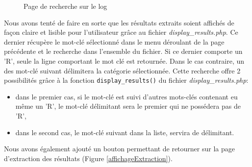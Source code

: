 \begin{figure}[!ht]
	\begin{center}
		\caption{Page de recherche sur le log}
  		\label{affichageResultats}
  	\end{center}	
\end{figure}

Nous avons tenté de faire en sorte que les résultats extraits soient affichés de façon claire et lisible pour l'utilisateur grâce au fichier \emph{display\_results.php}. Ce dernier récupère le mot-clé sélectionné dans le menu déroulant de la page précédente et le recherche dans l'ensemble du fichier. Si ce dernier comporte un 'R', seule la ligne comportant le mot clé est retournée. Dans le cas contraire, un des mot-clé suivant délimitera la catégorie sélectionnée. Cette recherche offre 2 possibilités grâce à la fonction \texttt{display\_results()} du fichier \emph{display\_results.php}:
\begin{itemize}
\item dans le premier cas, si le mot-clé est suivi d'autres mots-clés contenant eu même un 'R', le mot-clé délimitant sera le premier qui ne possédera pas de 'R',
\item dans le second cas, le mot-clé suivant dans la liste, servira de délimitant.
\end{itemize}

Nous avons également ajouté un bouton permettant de retourner sur la page d'extraction des résultats (Figure \ref{affichageExtraction}).

